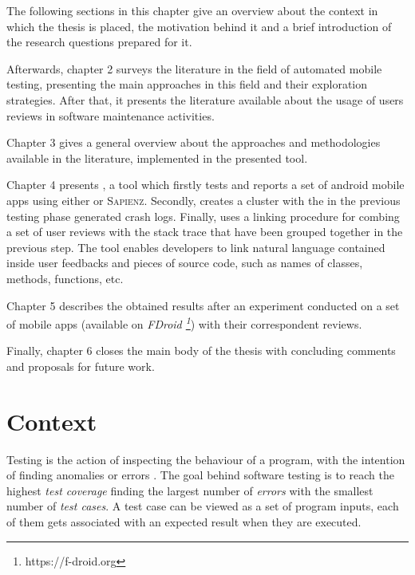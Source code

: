 The following sections in this chapter give an overview about the context in which the thesis is placed, the motivation behind it and a brief introduction of the research questions prepared for it. 

Afterwards, chapter 2 surveys the literature in the field of automated mobile testing, presenting the main approaches in this field and their exploration strategies. After that, it presents the literature available about the usage of users reviews in software maintenance activities. 

Chapter 3 gives a general overview about the approaches and methodologies available in the literature, implemented in the presented tool. 

Chapter 4 presents \toolname, a tool which firstly tests and reports a set of android mobile apps using either \monkey or \textsc{Sapienz}.  Secondly, creates a cluster with the in the previous testing phase generated crash logs. Finally, uses a linking procedure for combing a set of user reviews with the stack trace that have been grouped together in the previous step. The tool enables developers to link natural language contained inside user feedbacks and pieces of source code, such as names of classes, methods, functions, etc. 

Chapter 5 describes the obtained results after an experiment conducted on a set of mobile apps (available on \textit{FDroid \footnote{https://f-droid.org}}) with their correspondent reviews. 

Finally, chapter 6 closes the main body of the thesis with concluding comments and proposals for future work.


\section{Context}
Testing is the action of inspecting the behaviour of a program, with the intention of finding anomalies or errors \cite{testing}.
The goal behind software testing is to reach the highest \textit{test coverage} finding the largest number of \textit{errors} with the smallest number of \textit{test cases}. A test case can be viewed as a set of program inputs, each of them gets associated with an expected result when they are executed. 

